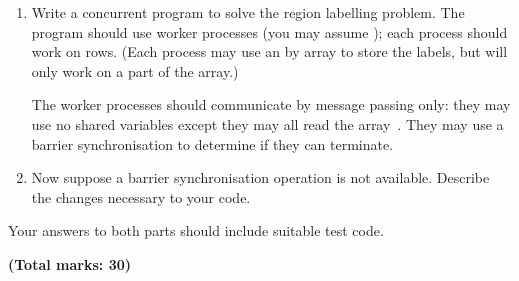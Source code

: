 \begin{question}

\begin{enumerate}
\item
Write a concurrent program to solve the region labelling problem.  The program
should use  worker processes (you may assume ); each
process should work on  rows.  (Each process may use an
 by  array to store the labels, but will only work on a part
of the array.)  

The worker processes should communicate by message passing only: they may use
no shared variables except they may all read the array~.  They may
use a barrier synchronisation to determine if they can terminate.



\item
Now suppose a barrier synchronisation operation is not available.  Describe
the changes necessary to your code.
\end{enumerate}

Your answers to both parts should include suitable test code.

{\bf(Total marks: 30)}
\end{question}



